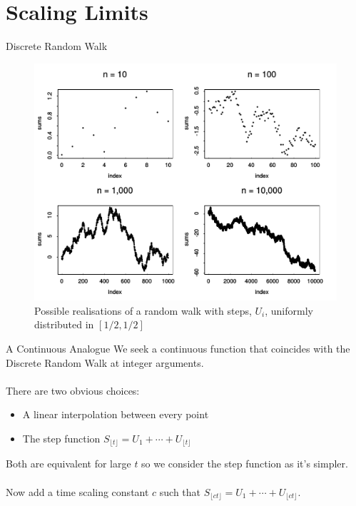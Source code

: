 \documentclass{beamer}
\begin{document}
\section{Scaling Limits}

\begin{frame}{Discrete Random Walk}
	\begin{figure}
		\includegraphics[scale=0.65]{Thesis/Figures/RandomWalk}
		\caption{Possible realisations of a random walk with steps, $U_i$, uniformly distributed in $[1/2,1/2]$}
	\end{figure}
\end{frame}

\begin{frame}{A Continuous Analogue}
	We seek a continuous  function that coincides with the Discrete Random Walk at integer arguments.
\\~\\
There are two obvious choices:
		\begin{itemize}
		\item A linear interpolation between every point
		\item The step function $S_{\lfloor t \rfloor}=U_1+\cdots+U_{\lfloor t \rfloor}$\newline
	    \end{itemize}
Both are equivalent for large $t$ so we consider the step function as it's simpler.
\\~\\
Now add a time scaling constant $c$ such that $S_{\lfloor ct \rfloor}=U_1+\cdots+U_{\lfloor ct \rfloor}$.
\end{frame}
\end{document}

